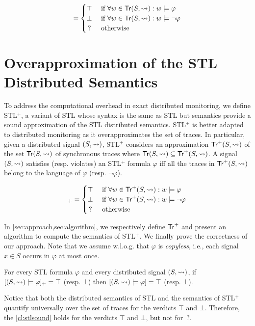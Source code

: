 \small
\begin{equation*}
	[(S,{\hb}) \models \varphi] = 
	\begin{cases}
		\top & \text{ if } \forall w \in \tr(S,{\hb}) : w \models \varphi \\
		\bot & \text{ if } \forall w \in \tr(S,{\hb}) : w \models \lnot\varphi \\
		\,? & \text{ otherwise}
	\end{cases}
\end{equation*}
\normalsize

\section{Overapproximation of the STL Distributed Semantics}
To address the computational overhead in exact distributed monitoring, we define STL$^+$, a variant of STL whose syntax is the same as STL but semantics provide a sound approximation of the STL distributed semantics.
STL$^+$ is better adapted to distributed monitoring as it overapproximates the set of traces.
In particular, given a distributed signal $(S,{\rightsquigarrow})$, STL$^+$ considers an approximation 
$\mathsf{Tr}^+(S,{\rightsquigarrow})$ of the set $\mathsf{Tr}(S,{\rightsquigarrow})$ of synchronous traces where $ \mathsf{Tr}(S,{\rightsquigarrow}) \subseteq \mathsf{Tr}^+(S,{\rightsquigarrow})$.
A signal $(S,{\rightsquigarrow})$ satisfies (resp. violates) an STL$^+$ formula $\varphi$ iff all the traces in $\mathsf{Tr}^+(S,{\rightsquigarrow})$ belong to the language of $\varphi$ (resp. $\lnot \varphi$).

\small
\begin{equation*}
	[(S,{\hb}) \models \varphi]_+ = 
	\begin{cases}
		\top & \text{ if } \forall w \in \tr^+(S,{\hb}) : w \models \varphi \\
		\bot & \text{ if } \forall w \in \tr^+(S,{\hb}) : w \models \lnot\varphi \\
		\,? & \text{ otherwise}
	\end{cases}
\end{equation*}
\normalsize

In \cref{sec:approach,sec:algorithm}, we respectively define $\mathsf{Tr}^+$ and present an algorithm to compute the semantics of STL$^+$.
We finally prove the correctness of our approach.
Note that we assume w.l.o.g. that $\varphi$ is \emph{copyless}, i.e., each signal $x \in S$ occurs in $\varphi$ at most once.

\begin{theorem} \label{cl:stlsound}
	For every STL formula $\varphi$ and every distributed signal $(S,{\rightsquigarrow})$, if $[(S,{\rightsquigarrow}) \models \varphi]_+ = \top$ (resp. $\bot$) then $[(S,{\rightsquigarrow}) \models \varphi] = \top$ (resp. $\bot$).
\end{theorem}

Notice that both the distributed semantics of STL and the semantics of STL$^+$ quantify universally over the set of traces for the verdicts $\top$ and $\bot$.
Therefore, the \cref{cl:stlsound} holds for the verdicts $\top$ and $\bot$, but not for ${\,?}$.

